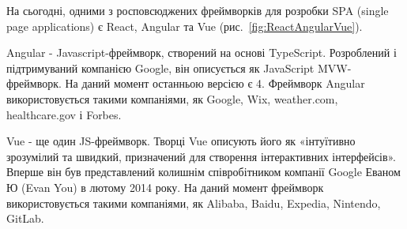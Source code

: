 На сьогодні, одними з росповсюджених фреймворків для розробки SPA (single page applications) є React, Angular та Vue (рис.~\ref{fig:ReactAngularVue}).


Angular - Javascript-фреймворк, створений на основі TypeScript. Розроблений і підтримуваний компанією Google, він описується як JavaScript MVW-фреймворк. На даний момент останньою версією є 4. Фреймворк Angular використовується такими компаніями, як Google, Wix, weather.com, healthcare.gov і Forbes.

Vue - ще один JS-фреймворк. Творці Vue описують його як «інтуїтивно зрозумілий та швидкий, призначений для створення інтерактивних інтерфейсів». Вперше він був представлений колишнім співробітником компанії Google Еваном Ю (Evan You) в лютому 2014 року. На даний момент фреймворк використовується такими компаніями, як Alibaba, Baidu, Expedia, Nintendo, GitLab.
